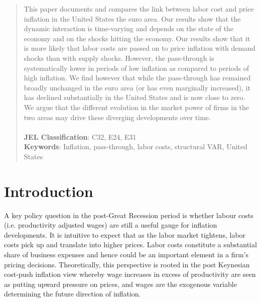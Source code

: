 \documentclass[11pt]{article}
\begin{document}
\begin{abstract}
\medskip
This paper documents and compares the link between labor cost and price inflation in the United States the euro area. Our results show that the dynamic interaction is time-varying and depends on the state of the economy and on the shocks hitting the economy. Our results show that it is more likely that labor costs are passed on to price inflation with demand shocks than with supply shocks. However, the pass-through is systematically lower in periods of low inflation as compared to periods of high inflation. We find however that while the pass-through has remained broadly unchanged in the euro area (or has even marginally increased), it has declined substantially in the United States and is now close to zero. We argue that the different evolution in the market power of firms in the two areas may drive these diverging developments over time.\\
\\
\noindent \textbf{JEL Classification}: C32, E24, E31\\
\noindent \textbf{Keywords}: Inflation, pass-through, labor costs, structural VAR, United States 

\end{abstract}
\clearpage

\pagebreak

\section{Introduction}
\label{Introduction}
A key policy question in the post-Great Recession period is whether labour costs (i.e. productivity adjusted wages) are still a useful gauge for inflation developments. It is intuitive to expect that as the labor market tightens, labor costs pick up and translate into higher prices. Labor costs constitute a substantial share of business expenses and hence could be an important element in a firm's pricing decisions. Theoretically, this perspective is rooted in the post Keynesian cost-push inflation view whereby wage increases in excess of productivity are seen as putting upward pressure on prices, and wages are the exogenous variable determining the future direction of inflation.
\end{document}
